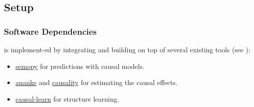 

\subsection{Setup}









\subsubsection{Software Dependencies}
\ourtool is implement-ed by integrating and building on top of several existing tools (see ): 
\begin{itemize}
    \item \href{https://semopy.com/}{\color{blue!80}semopy} for predictions with causal models.
    \item \href{https://ananke.readthedocs.io/en/latest/}{\color{blue!80}ananke} and \href{https://github.com/akelleh/causality}{\color{blue!80}causality} for estimating the causal effects.
    \item \href{https://github.com/cmu-phil/causal-learn}{\color{blue!80}causal-learn} for structure learning. 
\end{itemize}


